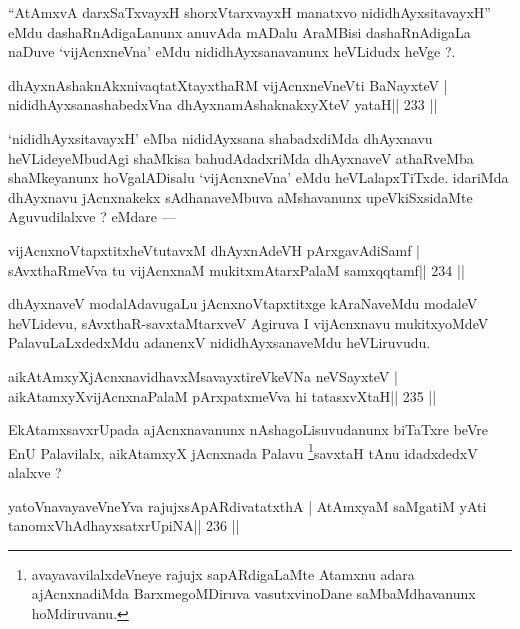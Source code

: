 \begin{artha}
``AtAmxvA darxSaTxvayxH shorxVtarxvayxH manatxvo nididhAyxsitavayxH'' eMdu dashaRnAdi\-gaLanunx anuvAda mADalu AraMBisi dashaRnAdigaLa naDuve `vijAcnxneVna' eMdu nididhAyxsanavanunx heVLidudx heVge ?.
\end{artha}


\begin{shl}
dhAyxnAshaknAkxnivaqtatXtayxthaRM vijAcnxneVneVti BaNayxteV |
nididhAyxsanashabedxVna dhAyxnamAshaknakxyXteV yataH\hfill || 233 ||
\end{shl}

\begin{artha}
`nididhAyxsitavayxH' eMba nididAyxsana shabadxdiMda dhAyxnavu heVLideyeMbudAgi shaMkisa bahudAdadxriMda dhAyxnaveV athaRveMba shaMkeyanunx hoVgalADisalu `vijAcnxneVna' eMdu heVLalapxTiTxde. idariMda dhAyxnavu jAcnxnakekx sAdhanaveMbuva aMshavanunx upeVkiSxsidaMte Aguvudilalxve ? eMdare  {\rm ---} 
\end{artha}

\begin{shl}
vijAcnxnoVtapxtitxheVtutavxM dhAyxnAdeVH pArxgavAdiSamf |
sAvxthaRmeVva tu vijAcnxnaM mukitxmAtarxPalaM samxqqtamf\hfill || 234 ||
\end{shl}

\begin{artha}
dhAyxnaveV modalAdavugaLu jAcnxnoVtapxtitxge kAraNaveMdu modaleV heVLidevu, sAvxthaR-savxtaMtarxveV Agiruva I vijAcnxnavu mukitxyoMdeV PalavuLaLxdedxMdu adanenxV nididhAyxsanaveMdu heVLiruvudu.
\end{artha}


\begin{shl}
aikAtAmxyXjAcnxnavidhavxMsavayxtireVkeVNa neVSayxteV |
aikAtamxyXvijAcnxnaPalaM pArxpatxmeVva hi tatasxvXtaH\hfill || 235 ||
\end{shl}

\begin{artha}
EkAtamxsavxrUpada ajAcnxnavanunx nAshagoLisuvudanunx biTaTxre beVre EnU Palavilalx, aikAtamxyX jAcnxnada Palavu \footnote[1]{avayavavilalxdeVneye rajujx sapARdigaLaMte Atamxnu adara ajAcnxnadiMda BarxmegoMDiruva vasutxvinoDane saMbaMdhavanunx hoMdiruvanu.}savxtaH tAnu idadxdedxV alalxve ?
\end{artha}

\begin{shl}
yatoV\s navayaveVneYva rajujxsApARdivatatxthA |
AtAmx\s yaM saMgatiM yAti tanomxVhAdhayxsatxrUpiNA\hfill || 236 ||
\end{shl}

